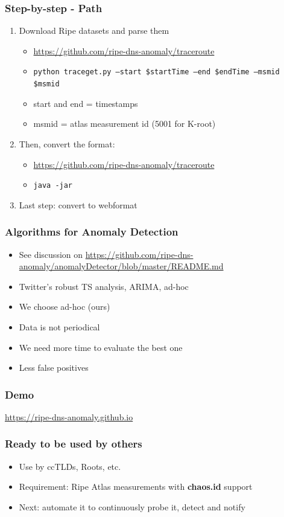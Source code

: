 \documentclass[serif]{beamer}
\begin{document}
\begin{frame}[fragile]
	\frametitle{Step-by-step - Path}
	
\begin{enumerate}
 \item Download Ripe datasets and parse them
 \begin{itemize}
  \item \url{https://github.com/ripe-dns-anomaly/traceroute }
  \item \texttt{python traceget.py --start \$startTime --end \$endTime --msmid \$msmid}
  \item start and end = timestamps
  \item msmid = atlas measurement id (5001 for K-root)
 \end{itemize}

 \item Then, convert the format:
 \begin{itemize}
  \item \url{https://github.com/ripe-dns-anomaly/traceroute}
  \item \texttt{java -jar}
 \end{itemize}

 \item Last step: convert to webformat
\end{enumerate}

\end{frame}

\begin{frame}[fragile]
	\frametitle{Algorithms for Anomaly Detection}
	\begin{itemize}
	 \item See discussion on 
\url{https://github.com/ripe-dns-anomaly/anomalyDetector/blob/master/README.md}
	\item Twitter's robust TS analysis, ARIMA, ad-hoc
	\item We choose ad-hoc (ours)
	\item Data is not periodical
	\item We need more time to evaluate the best one
	\item Less false positives
	\end{itemize}


\end{frame}


\begin{frame}[fragile]
	\frametitle{Demo}
	
	\large
	\url{https://ripe-dns-anomaly.github.io}

\end{frame}


\begin{frame}[fragile]
	\frametitle{Ready to be used by others}
\begin{itemize}
 \item Use by ccTLDs, Roots, etc.
 \item Requirement: Ripe Atlas measurements with \textbf{chaos.id} support
 \item Next: automate it to continuously probe it, detect and notify
\end{itemize}

\end{frame}
\end{document}
